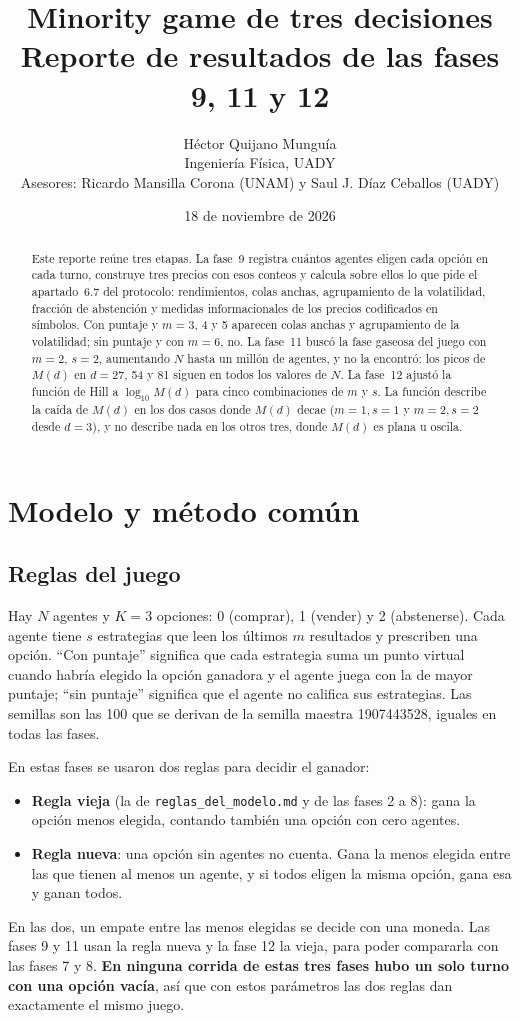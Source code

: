 \documentclass[11pt,letterpaper]{article}
\title{\textbf{Minority game de tres decisiones}\\[0.3em]
\large Reporte de resultados de las fases 9, 11 y 12}
\author{Héctor Quijano Munguía\\[0.2em]
\small Ingeniería Física, UADY\\
\small Asesores: Ricardo Mansilla Corona (UNAM) y Saul J. Díaz Ceballos (UADY)}
\date{18 de noviembre de 2026}
\begin{document}
\maketitle

\begin{abstract}
Este reporte reúne tres etapas. La fase~9 registra cuántos agentes eligen cada opción en cada turno, construye tres precios con esos conteos y calcula sobre ellos lo que pide el apartado~6.7 del protocolo: rendimientos, colas anchas, agrupamiento de la volatilidad, fracción de abstención y medidas informacionales de los precios codificados en símbolos. Con puntaje y $m=3$, 4 y 5 aparecen colas anchas y agrupamiento de la volatilidad; sin puntaje y con $m=6$, no. La fase~11 buscó la fase gaseosa del juego con $m=2$, $s=2$, aumentando $N$ hasta un millón de agentes, y no la encontró: los picos de $M(d)$ en $d=27$, 54 y 81 siguen en todos los valores de $N$. La fase~12 ajustó la función de Hill a $\log_{10}M(d)$ para cinco combinaciones de $m$ y $s$. La función describe la caída de $M(d)$ en los dos casos donde $M(d)$ decae ($m=1,s=1$ y $m=2,s=2$ desde $d=3$), y no describe nada en los otros tres, donde $M(d)$ es plana u oscila.
\end{abstract}

\tableofcontents
\newpage

\section{Modelo y método común}

\subsection{Reglas del juego}
Hay $N$ agentes y $K=3$ opciones: 0 (comprar), 1 (vender) y 2 (abstenerse). Cada agente tiene $s$ estrategias que leen los últimos $m$ resultados y prescriben una opción. ``Con puntaje'' significa que cada estrategia suma un punto virtual cuando habría elegido la opción ganadora y el agente juega con la de mayor puntaje; ``sin puntaje'' significa que el agente no califica sus estrategias. Las semillas son las 100 que se derivan de la semilla maestra 1907443528, iguales en todas las fases.

En estas fases se usaron dos reglas para decidir el ganador:
\begin{itemize}
\item \textbf{Regla vieja} (la de \texttt{reglas\_del\_modelo.md} y de las fases 2 a 8): gana la opción menos elegida, contando también una opción con cero agentes.
\item \textbf{Regla nueva}: una opción sin agentes no cuenta. Gana la menos elegida entre las que tienen al menos un agente, y si todos eligen la misma opción, gana esa y ganan todos.
\end{itemize}
En las dos, un empate entre las menos elegidas se decide con una moneda. Las fases 9 y 11 usan la regla nueva y la fase 12 la vieja, para poder compararla con las fases 7 y 8. \textbf{En ninguna corrida de estas tres fases hubo un solo turno con una opción vacía}, así que con estos parámetros las dos reglas dan exactamente el mismo juego.
\end{document}
